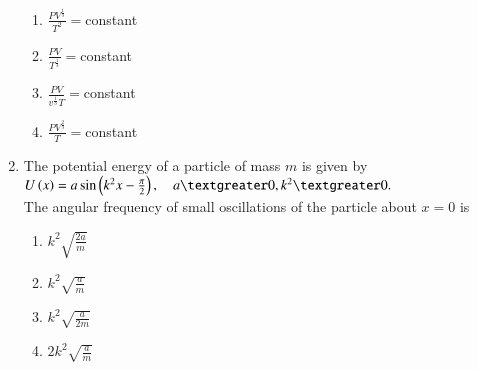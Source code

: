 \documentclass[journal]{IEEEtran}
\begin{document}
\begin{enumerate}
    \begin{enumerate}
        \item $\frac{PV^{\frac{1}{3}}}{T^2}=$constant
         \item $\frac{PV}{T^{\frac{1}{3}}}=$constant
        \item $\frac{PV}{v^{\frac{1}{3}}T}=$constant
        \item $\frac{PV^{\frac{2}{3}}}{T}=$constant
    \end{enumerate}
    \item The potential energy of a particle of mass $m$ is given by \\
    $U\brak{x}=a\sin\brak{k^2x-\frac{\pi}{2}},\quad a\textgreater 0,k^2\textgreater 0.$\\
    The angular frequency of small oscillations of the particle about $x=0$ is
    \begin{enumerate}
        \item $k^2\sqrt{\frac{2a}{m}}$
        \item $k^2\sqrt{\frac{a}{m}}$
        \item $k^2\sqrt{\frac{a}{2m}}$
        \item $2k^2\sqrt{\frac{a}{m}}$   
    \end{enumerate}
    
    
\end{enumerate}
\end{document}
